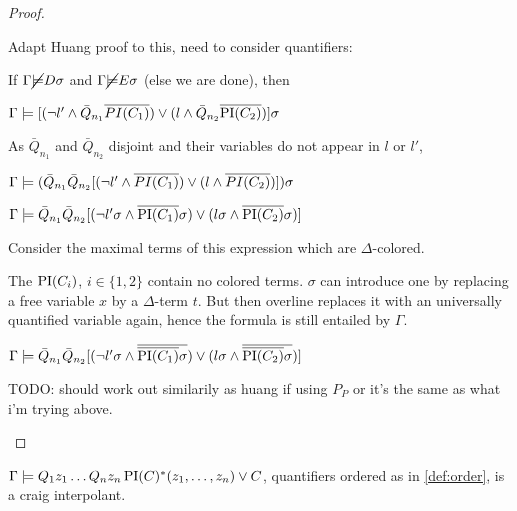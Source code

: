 \documentclass[,%
	paper=a4,%
	DIV20, 
	liststotoc,
	bibtotoc,
	draft=false,%
	numbers=noendperiod
]{scrartcl}
\begin{document}
\begin{proof}
\begin{enumerate}
			Adapt Huang proof to this, need to consider quantifiers:

			If $\Gamma \cancel {\models} D \sigma$ and 
			$\Gamma \cancel {\models} E \sigma$ (else we are done), then  

			$\Gamma \models [ (\lnot l' \land \bar Q_{n_1} \overline{PI(C_1)}) \lor (l \land \bar Q_{n_2} \overline{\operatorname{PI}(C_2)}) ] \sigma$

			As $\bar Q_{n_1}$ and $\bar Q_{n_2}$ disjoint and their variables do not appear in $l$ or $l'$,

			$\Gamma \models (\bar Q_{n_1} \bar Q_{n_2} [ (\lnot l' \land  \overline{PI(C_1)}) \lor (l \land \overline{PI(C_2)}) ] ) \sigma$

			$\Gamma \models \bar Q_{n_1} \bar Q_{n_2} [ (\lnot l'\sigma \land  \overline{\operatorname{PI}(C_1)}\sigma) \lor (l\sigma \land \overline{\operatorname{PI}(C_2)}\sigma) ] $

			Consider the maximal terms of this expression which are $\Delta$-colored.

			The $\operatorname{PI}(C_i)$, $i \in \{1,2\}$ contain no colored terms. $\sigma$ can introduce one by replacing a free variable $x$ by a $\Delta$-term $t$. But then overline replaces it with an universally quantified variable again, hence the formula is still entailed by $\Gamma$.

			$\Gamma \models \bar Q_{n_1} \bar Q_{n_2} [ (\lnot l'\sigma \land  \overline{\overline{\operatorname{PI}(C_1)}\sigma}) \lor (l\sigma \land \overline{\overline{\operatorname{PI}(C_2)}\sigma}) ] $



			TODO: should work out similarily as huang if using $P_P$ or it's the same as what i'm trying above.

	\end{enumerate}
\end{proof}



\begin{prop}
	$\Gamma \models Q_1 z_1 \ldots Q_n z_n \operatorname{PI}(C)^*(z_1, \ldots, z_n)  \lor C$, quantifiers ordered as in \ref{def:order}, is a craig interpolant.
\end{prop}
\end{document}

